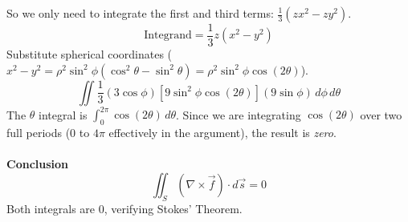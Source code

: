 \documentclass{article}
\begin{document}
So we only need to integrate the first and third terms:
$\frac{1}{3}(zx^2 - zy^2)$.
\[
	\text{Integrand} = \frac{1}{3} z (x^2 - y^2)
\]
Substitute spherical coordinates ($x^2 - y^2 = \rho^2\sin^2\phi(\cos^2\theta - \sin^2\theta) = \rho^2\sin^2\phi\cos(2\theta)$).
\[
	\iint \frac{1}{3} (3\cos\phi) [ 9\sin^2\phi \cos(2\theta) ] (9\sin\phi) \, d\phi \, d\theta
\]
The $\theta$ integral is $\int_0^{2\pi} \cos(2\theta) \, d\theta$. Since we are
integrating $\cos(2\theta)$ over two full periods ($0$ to $4\pi$ effectively in
the argument), the result is \textit{zero}.
\\
\\
\textbf{Conclusion}
\[
	\iint_S (\nabla \times \vec{f}) \cdot d\vec{s} = 0
\]
Both integrals are 0, verifying Stokes' Theorem.

\pagebreak

\end{document}

